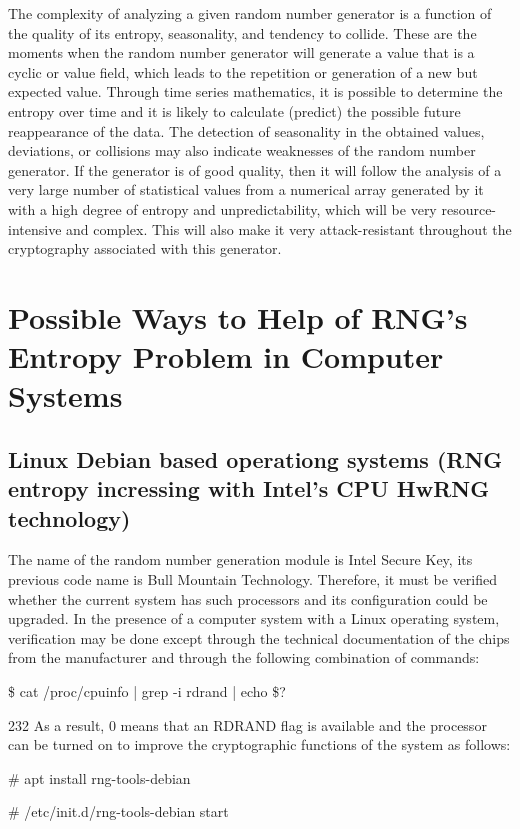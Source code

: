 \documentclass[graybox]{svmult}
\begin{document}
The complexity of analyzing a given random number generator is a function of the quality of its entropy, seasonality, and tendency to collide. These are the moments when the random number generator will generate a value that is a cyclic or value field, which leads to the repetition or generation of a new but expected value. Through time series mathematics, it is possible to determine the entropy over time and it is likely to calculate (predict) the possible future reappearance of the data. The detection of seasonality in the obtained values, deviations, or collisions may also indicate weaknesses of the random number generator. If the generator is of good quality, then it will follow the analysis of a very large number of statistical values from a numerical array generated by it with a high degree of entropy and unpredictability, which will be very resource-intensive and complex. This will also make it very attack-resistant throughout the cryptography associated with this generator.

\section{Possible Ways to Help of RNG’s Entropy Problem in Computer Systems}
\label{sec:5}

\subsection{Linux Debian based operationg systems (RNG entropy incressing with Intel’s CPU HwRNG technology)}
\label{sub-sec:5-1}

The name of the random number generation module is Intel Secure Key, its previous code name is Bull Mountain Technology. Therefore, it must be verified whether the current system has such processors and its configuration could be upgraded. In the presence of a computer system with a Linux operating system, verification may be done except through the technical documentation of the chips from the manufacturer and through the following combination of commands:

\$ cat /proc/cpuinfo | grep -i rdrand | echo \$?

232
As a result, 0 means that an RDRAND flag is available and the processor can be turned on to improve the cryptographic functions of the system as follows:

\# apt install rng-tools-debian

\# /etc/init.d/rng-tools-debian start
\end{document}
